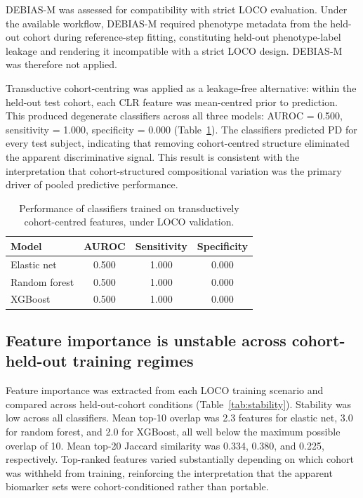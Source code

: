 \documentclass[12pt,a4paper]{article}
\begin{document}
DEBIAS-M was assessed for compatibility with strict LOCO evaluation.
Under the available workflow, DEBIAS-M required phenotype metadata from
the held-out cohort during reference-step fitting, constituting held-out
phenotype-label leakage and rendering it incompatible with a strict LOCO
design. DEBIAS-M was therefore not applied.

Transductive cohort-centring was applied as a leakage-free alternative:
within the held-out test cohort, each CLR feature was mean-centred prior to
prediction. This produced degenerate classifiers across all three models:
AUROC = 0.500, sensitivity = 1.000, specificity = 0.000
(Table~\ref{tab:corrected}). The classifiers predicted PD for every test
subject, indicating that removing cohort-centred structure eliminated the
apparent discriminative signal. This result is consistent with the
interpretation that cohort-structured compositional variation was the primary
driver of pooled predictive performance.

\begin{table}[h]
\centering
\caption{Performance of classifiers trained on transductively cohort-centred
features, under LOCO validation.}
\label{tab:corrected}
\begin{tabular}{lccc}
\toprule
Model & AUROC & Sensitivity & Specificity \\
\midrule
Elastic net   & 0.500 & 1.000 & 0.000 \\
Random forest & 0.500 & 1.000 & 0.000 \\
XGBoost       & 0.500 & 1.000 & 0.000 \\
\bottomrule
\end{tabular}
\end{table}

\subsection{Feature importance is unstable across cohort-held-out training
regimes}

Feature importance was extracted from each LOCO training scenario and
compared across held-out-cohort conditions (Table~\ref{tab:stability}).
Stability was low across all classifiers. Mean top-10 overlap was 2.3
features for elastic net, 3.0 for random forest, and 2.0 for XGBoost, all
well below the maximum possible overlap of 10. Mean top-20 Jaccard
similarity was 0.334, 0.380, and 0.225, respectively. Top-ranked features
varied substantially depending on which cohort was withheld from training,
reinforcing the interpretation that the apparent biomarker sets were
cohort-conditioned rather than portable.
\end{document}
